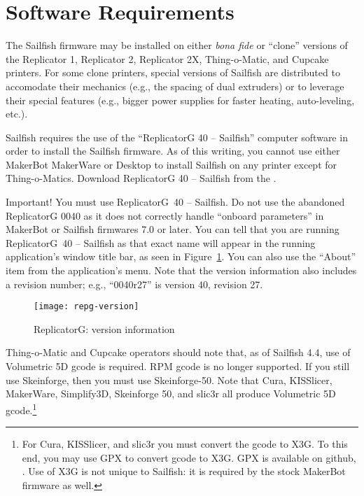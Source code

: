 
\section{Software Requirements} \label{sec:soft-reqs}

The Sailfish firmware may be installed on either \textit{bona fide} or
``clone'' versions of the Replicator 1, Replicator 2, Replicator 2X,
Thing-o-Matic, and Cupcake printers.  For some clone printers, special
versions of Sailfish are distributed to accomodate their mechanics (e.g.,
the spacing of dual extruders) or to leverage their special features
(e.g., bigger power supplies for faster heating, auto-leveling, etc.).

Sailfish requires the use of the ``ReplicatorG 40 -- Sailfish'' computer
software in order to install the Sailfish firmware.  As of this writing,
you cannot use either MakerBot MakerWare or Desktop to install Sailfish on
any printer except for Thing-o-Matics. Download ReplicatorG 40 -- Sailfish
from the .

\begin{bclogo}[logo=\bcattention, noborder=true, couleurBarre=red]{Important!}
You must use ReplicatorG~40 -- Sailfish.  Do not use the abandoned
ReplicatorG 0040 as it does not correctly handle ``onboard parameters'' in
MakerBot or Sailfish firmwares 7.0 or later.  You can tell that you are
running ReplicatorG~40 -- Sailfish as that exact name will appear in the
running application's window title bar, as seen in
Figure~\ref{fig:repg-version}.  You can also use the ``About'' item from the
application's menu.  Note that the version information also includes a
revision number; e.g., ``0040r27'' is version 40,
revision 27.
\end{bclogo}

\begin{figure}[!htbp]
  \centering
    \texttt{[image: repg-version]}
    \caption{ReplicatorG: version information}
  \label{fig:repg-version}
\end{figure}

Thing-o-Matic and Cupcake operators should note that, as of Sailfish
4.4, use of \gls{Volumetric 5D gcode} is required.  \gls{RPM gcode} is
no longer supported.  If you still use Skeinforge, then you must use
Skeinforge-50.  Note that Cura, KISSlicer, MakerWare, Simplify3D,
Skeinforge 50, and slic3r all produce Volumetric 5D
gcode.\footnote{For Cura, KISSlicer, and slic3r you must convert the
  gcode to \gls{X3G}.  To this end, you may use GPX to convert gcode to X3G.
  GPX is available on github,
.  Use of X3G
  is not unique to Sailfish: it is required by the stock MakerBot
  firmware as well.}

